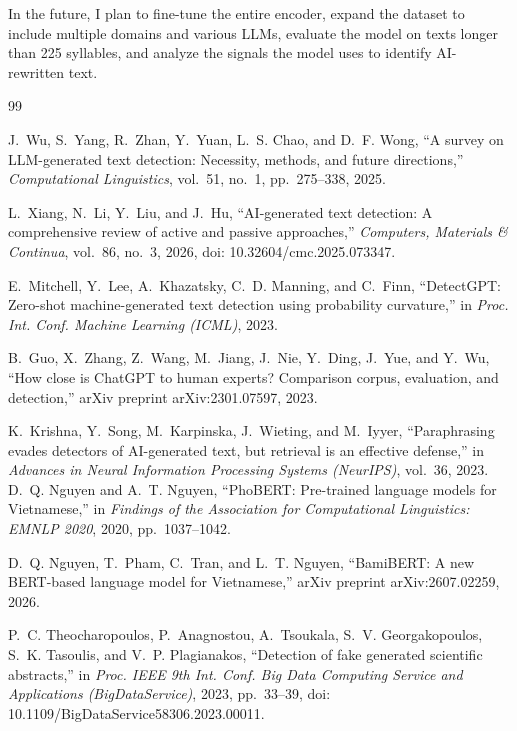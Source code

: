 \documentclass[conference,a4paper]{IEEEtran}
\begin{document}
In the future, I plan to fine-tune the entire encoder, expand the dataset to include multiple domains and various LLMs, evaluate the model on texts longer than 225 syllables, and analyze the signals the model uses to identify AI-rewritten text.

\nocite{*}
\begin{thebibliography}{99}

J.~Wu, S.~Yang, R.~Zhan, Y.~Yuan, L.~S. Chao, and D.~F. Wong, ``A survey on LLM-generated text detection: Necessity, methods, and future directions,'' \emph{Computational Linguistics}, vol.~51, no.~1, pp.~275--338, 2025.

L.~Xiang, N.~Li, Y.~Liu, and J.~Hu, ``AI-generated text detection: A comprehensive review of active and passive approaches,'' \emph{Computers, Materials \& Continua}, vol.~86, no.~3, 2026, doi: 10.32604/cmc.2025.073347.

E.~Mitchell, Y.~Lee, A.~Khazatsky, C.~D. Manning, and C.~Finn, ``DetectGPT: Zero-shot machine-generated text detection using probability curvature,'' in \emph{Proc. Int. Conf. Machine Learning (ICML)}, 2023.

B.~Guo, X.~Zhang, Z.~Wang, M.~Jiang, J.~Nie, Y.~Ding, J.~Yue, and Y.~Wu, ``How close is ChatGPT to human experts? Comparison corpus, evaluation, and detection,'' arXiv preprint arXiv:2301.07597, 2023.

K.~Krishna, Y.~Song, M.~Karpinska, J.~Wieting, and M.~Iyyer, ``Paraphrasing evades detectors of AI-generated text, but retrieval is an effective defense,'' in \emph{Advances in Neural Information Processing Systems (NeurIPS)}, vol.~36, 2023.
D.~Q. Nguyen and A.~T. Nguyen, ``PhoBERT: Pre-trained language models for Vietnamese,'' in \emph{Findings of the Association for Computational Linguistics: EMNLP 2020}, 2020, pp.~1037--1042.

D.~Q. Nguyen, T.~Pham, C.~Tran, and L.~T. Nguyen, ``BamiBERT: A new BERT-based language model for Vietnamese,'' arXiv preprint arXiv:2607.02259, 2026.

P.~C. Theocharopoulos, P.~Anagnostou, A.~Tsoukala, S.~V. Georgakopoulos, S.~K. Tasoulis, and V.~P. Plagianakos, ``Detection of fake generated scientific abstracts,'' in \emph{Proc. IEEE 9th Int. Conf. Big Data Computing Service and Applications (BigDataService)}, 2023, pp.~33--39, doi: 10.1109/BigDataService58306.2023.00011.


\end{thebibliography}
\end{document}
